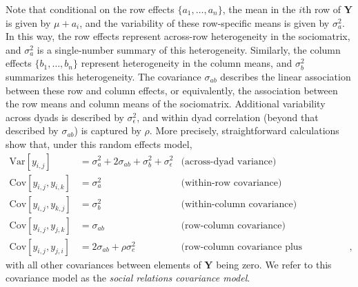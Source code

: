 \documentclass[11pt]{article}\usepackage[]{graphicx}\usepackage[]{color}
\newcommand{\bl}[1]{{\mathbf #1}}
\newcommand{\Var}[1]{{\text{Var}}[ \ensuremath{ #1 } ]  }
\newcommand{\Cov}[1]{{\text{Cov}}[ \ensuremath{ #1 } ]  }
\begin{document}
Note that conditional on the row effects $\{a_1,\ldots, a_n\}$, 
the mean in the $i$th row of $\bl Y$ is given by $\mu+a_i$, 
and the variability of these row-specific  means is given by $\sigma^2_a$. 
In this way, the row effects represent across-row heterogeneity in the 
sociomatrix, and $\sigma_a^2$ is a single-number summary of this 
heterogeneity. 
Similarly, the column effects $\{b_1,\ldots, b_n\}$ 
represent heterogeneity in the column means, and 
$\sigma^2_b$ summarizes this heterogeneity. 
The covariance $\sigma_{ab}$ 
describes the linear association 
between 
these row and column effects, or equivalently, 
the association between the row means and column means of the sociomatrix. 
Additional variability across dyads is described by $\sigma^2_\epsilon$, 
and within dyad correlation  (beyond that 
  described by $\sigma_{ab}$) is captured by $\rho$. 
More precisely, straightforward calculations show that, 
under this random effects model, 
\begin{align} 
\Var{ y_{i,j} } &= \sigma^2_a + 2 \sigma_{ab} + \sigma^2_b + \sigma_\epsilon^2 
  & \text{(across-dyad variance)}  \label{eqn:srmcov} \\
\Cov{ y_{i,j} ,y_{i,k} } & =  \sigma_a^2  & \text{(within-row covariance)} \nonumber  \\ 
\Cov{ y_{i,j} ,y_{k,j} } & =  \sigma_b^2 & \text{(within-column covariance)}  \nonumber  \\
 \Cov{ y_{i,j} ,y_{j,k} } & =  \sigma_{ab} & \text{(row-column covariance) }    \nonumber   \\
 \Cov{ y_{i,j} ,y_{j,i} } & =  2 \sigma_{ab} + \rho \sigma^2_e & \text{(row-column covariance plus reciprocity) },  \nonumber
\end{align}
with all other covariances between elements of $\bl Y$ being zero. 
We refer to this covariance model as the \emph{social relations covariance
model}. 
\end{document}

